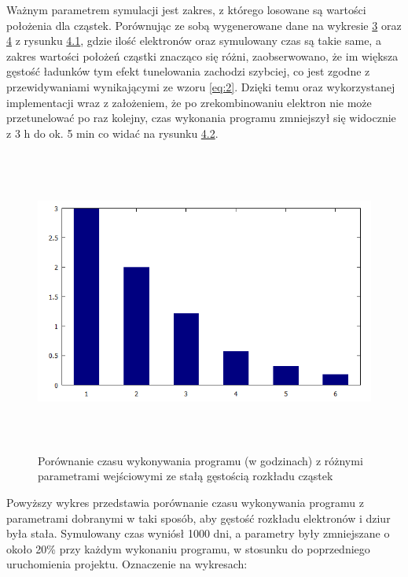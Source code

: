 Ważnym parametrem symulacji jest zakres, z którego losowane są wartości położenia dla cząstek. Porównując ze sobą wygenerowane dane na wykresie  \hyperref[wykres:1]{3} oraz \hyperref[wykres:2]{4} z rysunku \hyperref[rys:1]{4.1}, gdzie ilość elektronów oraz symulowany czas są takie same, a zakres wartości położeń cząstki znacząco się różni, zaobserwowano, że im większa gęstość ładunków tym efekt tunelowania zachodzi szybciej, co jest zgodne z przewidywaniami wynikającymi ze wzoru \ref{eq:2}. Dzięki temu oraz wykorzystanej implementacji wraz z założeniem, że po zrekombinowaniu elektron nie może przetunelować po raz kolejny, czas wykonania programu zmniejszył się widocznie z 3 h do ok. 5 min co widać na rysunku \hyperref[rys:2]{4.2}. 

\begin{figure}[H]
\centering
\includegraphics[width=17cm, height = 10cm]{czas_all}
\caption{Porównanie czasu wykonywania programu (w godzinach) z różnymi parametrami wejściowymi ze stałą gęstością rozkładu cząstek}
\label{rys:1}
\end{figure}

Powyższy wykres przedstawia porównanie czasu wykonywania programu z parametrami dobranymi w taki sposób, aby gęstość rozkładu elektronów i dziur była stała. Symulowany czas wyniósł 1000 dni, a parametry były zmniejszane o około 20\% przy każdym wykonaniu programu, w stosunku do poprzedniego uruchomienia projektu. Oznaczenie na wykresach:

